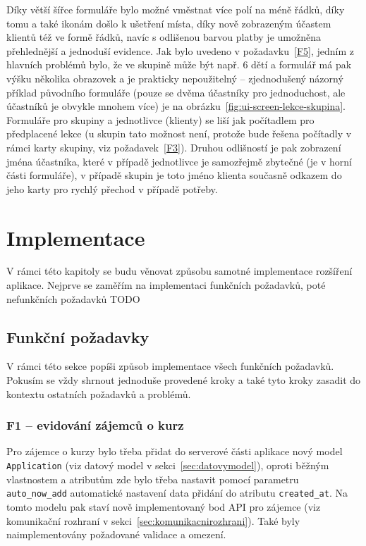Díky větší šířce formuláře bylo možné vměstnat více polí na méně řádků, díky tomu a také ikonám došlo k ušetření místa, díky nově zobrazeným účastem klientů též ve formě řádků, navíc s odlišenou barvou platby je umožněna přehlednější a jednoduší evidence. Jak bylo uvedeno v požadavku~\ref{F5}, jedním z hlavních problémů bylo, že ve skupině může být např. 6 dětí a formulář má pak výšku několika obrazovek a je prakticky nepoužitelný -- zjednodušený názorný příklad původního formuláře (pouze se dvěma účastníky pro jednoduchost, ale účastníků je obvykle mnohem více) je na obrázku~\ref{fig:ui-screen-lekce-skupina}. Formuláře pro skupiny a jednotlivce (klienty) se liší jak počítadlem pro předplacené lekce (u skupin tato možnost není, protože bude řešena počítadly v rámci karty skupiny, viz požadavek~\ref{F3}). Druhou odlišností je pak zobrazení jména účastníka, které v případě jednotlivce je samozřejmě zbytečné (je v horní části formuláře), v případě skupin je toto jméno klienta současně odkazem do jeho karty pro rychlý přechod v případě potřeby.

\chapter{Implementace}

V rámci této kapitoly se budu věnovat způsobu samotné implementace rozšíření aplikace. Nejprve se zaměřím na implementaci funkčních požadavků, poté nefunkčních požadavků TODO



\section{Funkční požadavky}

V rámci této sekce popíši způsob implementace všech funkčních požadavků. Pokusím se vždy shrnout jednoduše provedené kroky a také tyto kroky zasadit do kontextu ostatních požadavků a problémů.


\subsection{F1 -- evidování zájemců o kurz}

Pro zájemce o kurzy bylo třeba přidat do serverové části aplikace nový model \verb|Application| (viz datový model v sekci~\ref{sec:datovymodel}), oproti běžným vlastnostem a atributům zde bylo třeba nastavit pomocí parametru \verb|auto_now_add| automatické nastavení data přidání do atributu \verb|created_at|. Na tomto modelu pak staví nově implementovaný bod API pro zájemce (viz komunikační rozhraní v sekci~\ref{sec:komunikacnirozhrani}). Také byly naimplementovány požadované validace a omezení.

